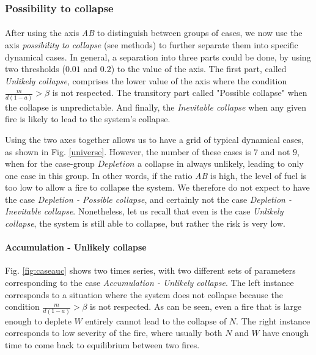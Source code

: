 \documentclass{article}
\begin{document}

\newpage

\subsubsection{Possibility to collapse}


\paragraph{} %
After using the axis \textit{AB} to distinguish between groups of cases, we now use the axis \textit{possibility to collapse} (see methods) to further separate them into specific dynamical cases. In general, a separation into three parts could be done, by using two thresholds ($0.01$ and $0.2$) to the value of the axis. The first part, called \textit{Unlikely collapse}, comprises the lower value of the axis where the condition $\frac{m}{d( 1-a)} > \beta$ is not respected. The transitory part called "Possible collapse" when the collapse is unpredictable. And finally, the \textit{Inevitable collapse} when any given fire is likely to lead to the system's collapse.

Using the two axes together allows us to have a grid of typical dynamical cases, as shown in Fig. \ref{universe}. However, the number of these cases is $7$ and not $9$, when for the case-group $Depletion$ a collapse in always unlikely, leading to only one case in this group. In other words, if the ratio \textit{AB} is high, the level of fuel is too low to allow a fire to collapse the system. We therefore do not expect to have the case \textit{Depletion - Possible collapse}, and certainly not the case \textit{Depletion - Inevitable collapse}. Nonetheless, let us recall that even is the case \textit{Unlikely collapse}, the system is still able to collapse, but rather the risk is very low.


\paragraph{Accumulation - Unlikely collapse\\}
Fig. \ref{fig:caseauc} shows two times series, with two different sets of parameters corresponding to the case \textit{Accumulation - Unlikely collapse}. The left instance corresponds to a situation where the system does not collapse because the condition $\frac{m}{d( 1-a)} > \beta$ is not respected. As can be seen, even a fire that is large enough to deplete $W$ entirely cannot lead to the collapse of $N$. The right instance corresponds to low severity of the fire, where usually both $N$ and $W$ have enough time to come back to equilibrium between two fires.
\end{document}
